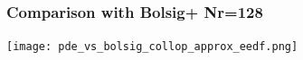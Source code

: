 \documentclass[mathserif, aspectratio=169]{beamer}
\begin{document}
\begin{frame}
	\frametitle{Comparison with Bolsig+ Nr=128}
	\centering
	\texttt{[image: pde\_vs\_bolsig\_collop\_approx\_eedf.png]}
\end{frame}
\end{document}
